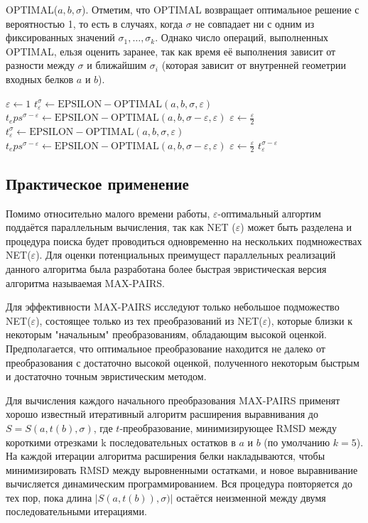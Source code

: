 \documentclass[a4papper]{article}
\newcommand{\la}{\leftarrow}
\newcommand{\eps}{\varepsilon}
\begin{document}
OPTIMAL($a, b, \sigma$). Отметим, что OPTIMAL возвращает оптимальное решение с вероятностью 1, то есть в случаях, когда $\sigma$ не совпадает ни с одним из фиксированных значений $\sigma_1, \dots, \sigma_k$. Однако число операций, выполненных OPTIMAL, ельзя оценить заранее, так как время её выполнения зависит от разности между $\sigma$ и ближайшим $\sigma_i$ (которая зависит от внутренней геометрии входных белков $a$ и $b$). 

\begin{algorithmic}[1]
\State $\eps \la 1$
\State $t_\eps^\sigma \la \mathrm{EPSILON-OPTIMAL}(a, b, \sigma, \eps)$
\State $t_eps^{\sigma - \eps} \la \mathrm{EPSILON-OPTIMAL}(a, b, \sigma - \eps, \eps)$
\State $\eps \la \frac{\eps}{2}$
\While{$|S(a, t_\eps^\sigma (b), \sigma + \eps )| - |S(a, t_\eps^{\sigma - \eps}(b), \sigma ) > 0$}
\State $t_\eps^\sigma \la \mathrm{EPSILON-OPTIMAL}(a, b, \sigma, \eps)$
\State $t_eps^{\sigma - \eps} \la \mathrm{EPSILON-OPTIMAL}(a, b, \sigma - \eps, \eps)$
\State $\eps \la \frac{\eps}{2}$
\EndWhile
\State \Return $t_\eps^{\sigma - \eps}$
\end{algorithmic}

\subsection{Практическое применение}
Помимо относительно малого времени работы, $\eps$-оптимальный алгортим поддаётся параллельным вычисления, так как NET ($\eps$) может быть разделена и процедура поиска будет проводиться одновременно на нескольких подмножествах NET($\eps$). Для оценки потенциальных преимущест параллельных реализаций данного алгоритма была разработана более быстрая эвристическая версия алгоритма называемая MAX-PAIRS.

Для эффективности MAX-PAIRS исследуют только небольшое подможество NET($\eps$), состоящее только из тех преобразований из NET($\eps$), которые близки к некоторым "начальным" преобразованиям, обладающим высокой оценкой. Предполагается, что оптимальное преобразование находится не далеко от преобразования с достаточно высокой оценкой, полученного некоторым быстрым и достаточно точным эвристическим методом.

Для вычисления каждого начального преобразования MAX-PAIRS применят хорошо известный итеративный алгоритм расширения выравнивания до $S = S(a, t(b), \sigma)$, где $t$-преобразование, минимизирующее RMSD между короткими отрезками k последовательных остатков в $a$ и $b$ (по умолчанию $k = 5$). На каждой итерации алгоритма расширения белки накладываются, чтобы минимизировать RMSD между выровненными остатками, и новое выравнивание вычисляется динамическим программированием. Вся процедура повторяется до тех пор, пока длина $|S(a, t(b)), \sigma)|$ остаётся неизменной между двумя последовательными итерациями.
\end{document}
